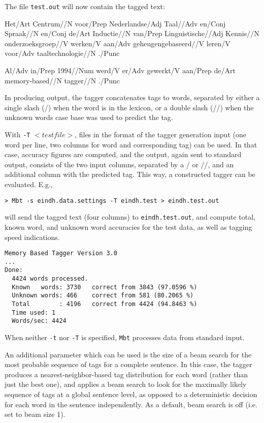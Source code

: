 \documentclass{report}
\begin{document}
The file {\tt test.out} will now contain the tagged text:

{\small 

Het/Art Centrum//N voor/Prep Nederlandse/Adj Taal//Adv en/Conj
Spraak//N en/Conj de/Art Inductie//N van/Prep Linguistische//Adj
Kennis//N onderzoeksgroep//V werken/V aan/Adv geheugengebaseerd//V
leren/V voor/Adv taaltechnologie//N ./Punc

Al/Adv in/Prep 1994//Num werd/V er/Adv gewerkt/V aan/Prep de/Art memory-based//N tagger//N ./Punc  
}

In producing output, the tagger concatenates tags to words,
separated by either a single slash (/) when the word is in the
lexicon, or a double slash (//) when the unknown words case base was
used to predict the tag.

With {\tt -T} $<testfile>$, files in the format of the tagger generation
input (one word per line, two columns for word and corresponding tag)
can be used. In that case, accuracy figures are computed, and the
output, again sent to standard output, consists of the two input
columns, separated by a / or //, and an additional column with the
predicted tag. This way, a constructed tagger can be evaluated. E.g., 

{\small
\begin{verbatim}
> Mbt -s eindh.data.settings -T eindh.test > eindh.test.out
\end{verbatim}
}

will send the tagged text (four columns) to {\tt eindh.test.out},
and compute total, known word, and unknown word accuracies for the
test data, as well as tagging speed indications.

{\small
\begin{verbatim}
Memory Based Tagger Version 3.0
...
Done:
  4424 words processed.
  Known   words: 3730   correct from 3843 (97.0596 %)
  Unknown words: 466    correct from 581 (80.2065 %)
  Total        : 4196   correct from 4424 (94.8463 %)
  Time used: 1
  Words/sec: 4424
\end{verbatim}
}

When neither {\tt -t} nor {\tt -T} is specified, {\tt Mbt} processes data from
standard input.

An additional parameter which can be used is the size of a beam search
for the most probable sequence of tags for a complete sentence. In
this case, the tagger produces a nearest-neighbor-based tag
distribution for each word (rather than just the best one), and
applies a beam search to look for the maximally likely sequence of tags
at a global sentence level, as opposed to a deterministic decision for
each word in the sentence independently. As a default, beam search is
off (i.e. set to beam size 1).
\end{document}
